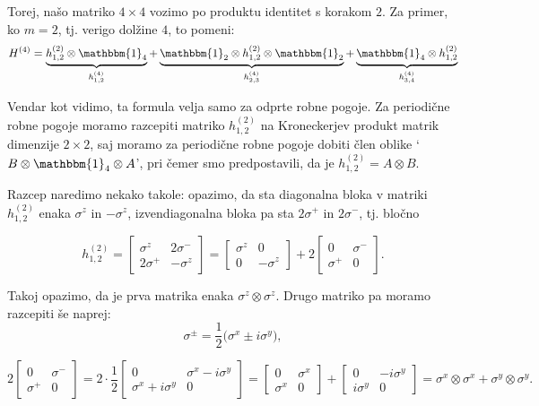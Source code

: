 \documentclass[12pt, a4paper]{article}
\begin{document}
Torej, na\v so matriko $4 \times 4$ vozimo po produktu identitet s korakom $2$. Za primer, ko $m = 2$,
tj. verigo dol\v zine $4$, to pomeni:
\[
	H^{(4)} = \underbrace{h^{(2)}_{1,2}\otimes\mathbbm{1}_4}_{h^{(4)}_{1,2}} +
		\underbrace{\mathbbm{1}_2\otimes h^{(2)}_{1,2}\otimes\mathbbm{1}_2}_{h^{(4)}_{2,3}} +
		\underbrace{\mathbbm{1}_4\otimes h^{(2)}_{1,2}}_{h^{(4)}_{3,4}}
\]

Vendar kot vidimo, ta formula velja samo za odprte robne pogoje. Za periodi\v cne robne pogoje
moramo razcepiti matriko $h^{(2)}_{1,2}$ na Kroneckerjev produkt matrik dimenzije $2 \times 2$, saj
moramo za periodi\v cne robne pogoje dobiti \v clen oblike `$B \otimes \mathbbm{1}_4 \otimes A$',
pri \v cemer smo predpostavili, da je $h^{(2)}_{1,2} = A \otimes B$.

Razcep naredimo nekako takole: opazimo, da sta diagonalna bloka v matriki $h^{(2)}_{1,2}$ enaka
$\sigma^z$ in $-\sigma^z$, izvendiagonalna bloka pa sta $2\sigma^+$ in $2\sigma^-$, tj. blo\v cno

\[
	h^{(2)}_{1,2} = \begin{bmatrix}
		\sigma^z & 2\sigma^- \\
		2\sigma^+ & -\sigma^z
	\end{bmatrix} = 
		\begin{bmatrix}
			\sigma^z & 0 \\
			0 & -\sigma^z
		\end{bmatrix} + 2\begin{bmatrix}
			0 & \sigma^- \\
			\sigma^+ & 0
		\end{bmatrix}.
\]

Takoj opazimo, da je prva matrika enaka $\sigma^z \otimes \sigma^z$. Drugo matriko pa moramo
razcepiti \v se naprej:
\[
	\sigma^\pm = \frac{1}{2}\big(\sigma^x \pm i\sigma^y\big),
\]

\[
	2\begin{bmatrix}
		0 & \sigma^- \\
		\sigma^+ & 0
	\end{bmatrix} = 2 \cdot \frac{1}{2} \begin{bmatrix}
		0 & \sigma^x - i\sigma^y \\
		\sigma^x + i\sigma^y & 0
	\end{bmatrix} = \begin{bmatrix}
		0 & \sigma^x \\
		\sigma^x & 0
	\end{bmatrix} + \begin{bmatrix}
		0 & -i\sigma^y \\
		i \sigma^y & 0
	\end{bmatrix} = \sigma^x \otimes \sigma^x + \sigma^y \otimes \sigma^y.
\]
\end{document}
